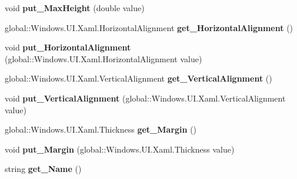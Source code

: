 \begin{DoxyCompactItemize}
void {\bfseries put\+\_\+\+Max\+Height} (double value)
\item 
\mbox{\label{interface_windows_1_1_u_i_1_1_xaml_1_1_i_framework_element_a60effb1f7f1912daafa8558633745836}} 
global\+::\+Windows.\+U\+I.\+Xaml.\+Horizontal\+Alignment {\bfseries get\+\_\+\+Horizontal\+Alignment} ()
\item 
\mbox{\label{interface_windows_1_1_u_i_1_1_xaml_1_1_i_framework_element_a94803d051b65803464005eaca8d55c70}} 
void {\bfseries put\+\_\+\+Horizontal\+Alignment} (global\+::\+Windows.\+U\+I.\+Xaml.\+Horizontal\+Alignment value)
\item 
\mbox{\label{interface_windows_1_1_u_i_1_1_xaml_1_1_i_framework_element_a5c99e9c5ee87e9df550209699e7666f7}} 
global\+::\+Windows.\+U\+I.\+Xaml.\+Vertical\+Alignment {\bfseries get\+\_\+\+Vertical\+Alignment} ()
\item 
\mbox{\label{interface_windows_1_1_u_i_1_1_xaml_1_1_i_framework_element_aad18ff5b25e09bbbcc7f6a3b5519e4ab}} 
void {\bfseries put\+\_\+\+Vertical\+Alignment} (global\+::\+Windows.\+U\+I.\+Xaml.\+Vertical\+Alignment value)
\item 
\mbox{\label{interface_windows_1_1_u_i_1_1_xaml_1_1_i_framework_element_a4b7dbc2a4b60e47ea9bfe8bc5ee3ad33}} 
global\+::\+Windows.\+U\+I.\+Xaml.\+Thickness {\bfseries get\+\_\+\+Margin} ()
\item 
\mbox{\label{interface_windows_1_1_u_i_1_1_xaml_1_1_i_framework_element_a38f9babd2b0b51bb24956c953463c95b}} 
void {\bfseries put\+\_\+\+Margin} (global\+::\+Windows.\+U\+I.\+Xaml.\+Thickness value)
\item 
\mbox{\label{interface_windows_1_1_u_i_1_1_xaml_1_1_i_framework_element_a1e142daabb976702923de9dd5bad0e79}} 
string {\bfseries get\+\_\+\+Name} ()
\item 
\mbox{\label{interface_windows_1_1_u_i_1_1_xaml_1_1_i_framework_element_a85f9478adc486dc6da6301bf424b0bec}} 

\end{DoxyCompactItemize}
